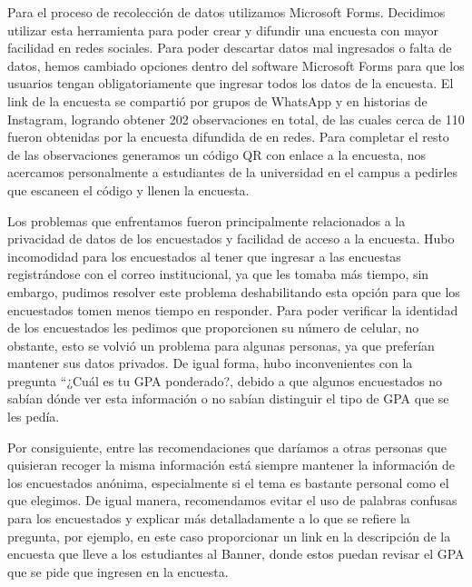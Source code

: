 \documentclass[25pt]{article}
\begin{document}
Para el proceso de recolección de datos utilizamos Microsoft Forms. Decidimos utilizar esta herramienta para poder crear y difundir una encuesta con mayor facilidad en redes sociales. Para poder descartar datos mal ingresados o falta de datos, hemos cambiado opciones dentro del software Microsoft Forms para que los usuarios tengan obligatoriamente que ingresar todos los datos de la encuesta.
El link de la encuesta se compartió por grupos de WhatsApp y en historias de Instagram, logrando obtener 202 observaciones en total, de las cuales cerca de 110 fueron obtenidas por la encuesta difundida de en redes. Para completar el resto de las observaciones generamos un código QR con enlace a la encuesta, nos acercamos personalmente a estudiantes de la universidad en el campus a pedirles que escaneen el código y llenen la encuesta. \par
\vspace{0.25cm}
Los problemas que enfrentamos fueron principalmente relacionados a la privacidad de datos de los encuestados y facilidad de acceso a la encuesta. Hubo incomodidad para los encuestados al tener que ingresar a las encuestas registrándose con el correo institucional, ya que les tomaba más tiempo, sin embargo, pudimos resolver este problema deshabilitando esta opción para que los encuestados tomen menos tiempo en responder. Para poder verificar la identidad de los encuestados les pedimos que proporcionen su número de celular, no obstante, esto se volvió un problema para algunas personas, ya que preferían mantener sus datos privados. De igual forma, hubo inconvenientes con la pregunta “¿Cuál es tu GPA ponderado?, debido a que algunos encuestados no sabían dónde ver esta información o no sabían distinguir el tipo de GPA que se les pedía. \par
\vspace{0.25cm}
Por consiguiente, entre las recomendaciones que daríamos a otras personas que quisieran recoger la misma información está siempre mantener la información de los encuestados anónima, especialmente si el tema es bastante personal como el que elegimos. De igual manera, recomendamos evitar el uso de palabras confusas para los encuestados y explicar más detalladamente a lo que se refiere la pregunta, por ejemplo, en este caso proporcionar un link en la descripción de la encuesta que lleve a los estudiantes al Banner, donde estos puedan revisar el GPA que se pide que ingresen en la encuesta.  \par
\vspace{0.5cm}
\end{document}
